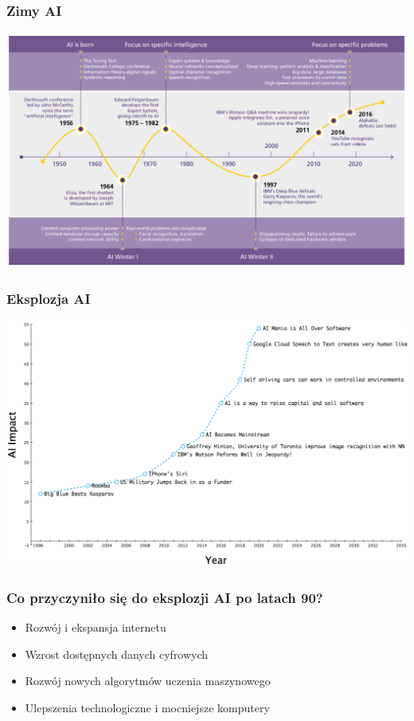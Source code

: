 \documentclass[smaller]{beamer}
\begin{document}

\begin{frame}
\frametitle{Zimy AI}
\includegraphics[width=\textwidth,height=\textheight,keepaspectratio]{../manifest/ai-winter-plot.png}
\end{frame}


\begin{frame}
\frametitle{Eksplozja AI}
\includegraphics[width=\textwidth,height=\textheight,keepaspectratio]{../manifest/new-hope.png}
\end{frame}


\begin{frame}
\frametitle{Co przyczyniło się do eksplozji AI po latach 90?}

\begin{itemize}
    \item Rozwój i ekspansja internetu
    \item Wzrost dostępnych danych cyfrowych
    \item Rozwój nowych algorytmów uczenia maszynowego
    \item Ulepszenia technologiczne i mocniejsze komputery
\end{itemize}

\end{frame}
\end{document}
